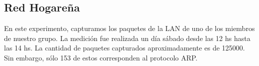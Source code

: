 \subsection{Red Hogareña}

En este experimento, capturamos los paquetes de la LAN de uno de los miembros de nuestro grupo. La medición fue realizada un día sábado desde las 12 hs hasta las 14 hs. La cantidad de paquetes capturados aproximadamente es de 125000. Sin embargo, sólo 153 de estos corresponden al protocolo ARP.


